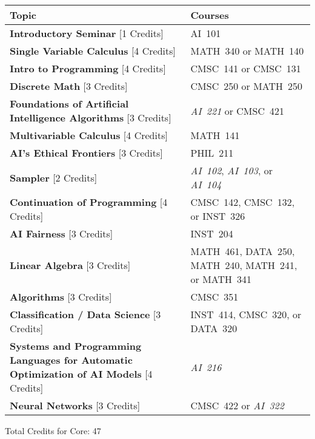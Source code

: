 \begin{longtable}{p{7cm}>{\raggedleft\arraybackslash}p{7cm}}
Topic & Courses \\
\toprule
\textbf{Introductory Seminar} [1 Credits] & AI~101                         \\
\textbf{Single Variable Calculus} [4 Credits] & MATH~340 or MATH~140       \\
\textbf{Intro to Programming} [4 Credits] & CMSC~141 or CMSC~131           \\
\textbf{Discrete Math} [3 Credits] & CMSC~250 or MATH~250                  \\
\textbf{Foundations of Artificial Intelligence Algorithms} [3 Credits] & \textit{AI~221} or CMSC~421 \\
\textbf{Multivariable Calculus} [4 Credits] & MATH~141                     \\
\textbf{AI's Ethical Frontiers} [3 Credits] & PHIL~211                     \\
\textbf{Sampler} [2 Credits] & \textit{AI~102}, \textit{AI~103}, or \textit{AI~104} \\
\textbf{Continuation of Programming} [4 Credits] & CMSC~142, CMSC~132, or INST~326 \\
\textbf{AI Fairness} [3 Credits] & INST~204                                \\
\textbf{Linear Algebra} [3 Credits] & MATH~461, DATA~250, MATH~240, MATH~241, or MATH~341 \\
\textbf{Algorithms} [3 Credits] & CMSC~351                                 \\
\textbf{Classification / Data Science} [3 Credits] & INST~414, CMSC~320, or DATA~320 \\
\textbf{Systems and Programming Languages for Automatic Optimization of AI Models} [4 Credits] & \textit{AI~216} \\
\textbf{Neural Networks} [3 Credits] & CMSC~422 or \textit{AI~322}         \\
\bottomrule
\end{longtable}
Total Credits for Core: 47
